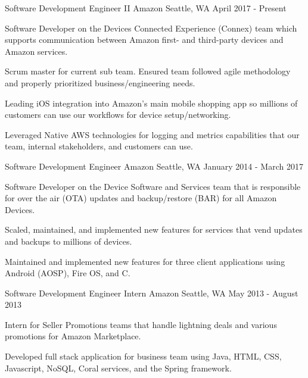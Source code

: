 \documentclass[
    changecolor={35, 47, 63},
]{resume}
\begin{document}
\pagestyle{empty} %

\cventry
  {Software Development Engineer II}
  {Amazon}
  {Seattle, WA}
  {April 2017 - Present}
  {
    \begin{cvitems}
      \item {Software Developer on the Devices Connected Experience (Connex) team which supports communication between Amazon first- and third-party devices and Amazon services.}
      \item {Scrum master for current sub team. Ensured team followed agile methodology and properly prioritized business/engineering needs.}
      \item {Leading iOS integration into Amazon's main mobile shopping app so millions of customers can use our workflows for device setup/networking.}
      \item {Leveraged Native AWS technologies for logging and metrics capabilities that our team, internal stakeholders, and customers can use.}
    \end{cvitems}
  }
\cventry
  {Software Development Engineer}
  {Amazon}
  {Seattle, WA}
  {January 2014 - March 2017}
  {
    \begin{cvitems}
      \item {Software Developer on the Device Software and Services team that is responsible for over the air (OTA) updates and backup/restore (BAR) for all Amazon Devices.}
      \item {Scaled, maintained, and implemented new features for services that vend updates and backups to millions of devices.}
      \item {Maintained and implemented new features for three client applications using Android (AOSP), Fire OS, and C.}
    \end{cvitems}
  }
\cventry
  {Software Development Engineer Intern}
  {Amazon}
  {Seattle, WA}
  {May 2013 - August 2013}
  {
    \begin{cvitems}
      \item {Intern for Seller Promotions teams that handle lightning deals and various promotions for Amazon Marketplace.}
      \item {Developed full stack application for business team using Java, HTML, CSS, Javascript, NoSQL, Coral services, and the Spring framework.}
    \end{cvitems}
  }
\end{document}
